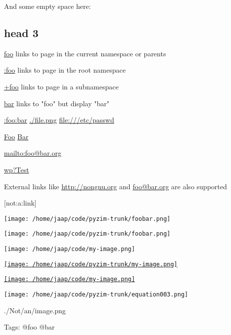 And some empty space here:







\subsection{head 3}

\href{foo}{foo}
  links to page in the current namespace or parents

\href{:foo}{:foo}
 links to page in the root namespace

\href{+foo}{+foo}
 links to page in a subnamespace

\href{foo}{bar}
 links to "foo" but display "bar"



\href{:foo:bar}{:foo:bar}
 \href{./file.png}{./file.png}
 \href{file:///etc/passwd}{file:///etc/passwd}


\href{Foo}{Foo}
\href{Bar}{Bar}




\href{mailto:foo@bar.org}{mailto:foo@bar.org}


\href{http://en.wikipedia.org/wiki/Test}{wp?Test}




External links like \href{http://nongnu.org}{http://nongnu.org}
 and \href{mailto:foo@bar.org}{foo@bar.org}
 are also supported



[not:a:link]





\texttt{[image: /home/jaap/code/pyzim-trunk/foobar.png]}

\texttt{[image: /home/jaap/code/pyzim-trunk/foobar.png]}

\texttt{[image: /home/jaap/code/my-image.png]}

\href{Foo}{\texttt{[image: /home/jaap/code/pyzim-trunk/my-image.png]}}

\href{:foo:bar}{\texttt{[image: /home/jaap/code/my-image.png]}}

\texttt{[image: /home/jaap/code/pyzim-trunk/equation003.png]}



{./Not/an/image.png}



Tags: @foo @bar





